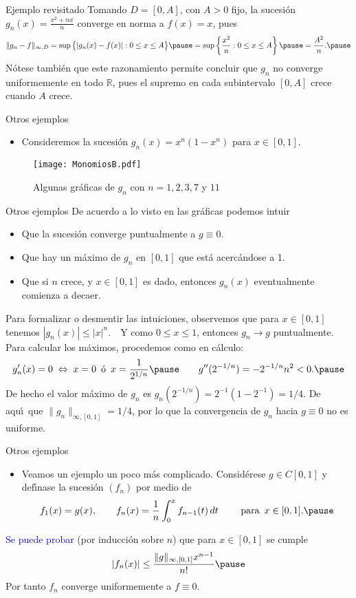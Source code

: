 \documentclass[xcolor=dvipsnames,10pt,handout, draft]{beamer}
\newcommand{\rz}{\mathbb R}
\begin{document}
\begin{frame}{Ejemplo revisitado}
Tomando $D=[0,A]$, con $A>0$ fijo, la sucesi\'on $\displaystyle g_n(x)=\frac{x^2+nx}{n}$ converge en norma a $f(x)=x$, pues
$$\|g_n-f\|_{\infty,D}=\sup\big\{|g_n(x)-f(x)|:0\leq x\leq A\big\}\pause=\sup\left\{\frac{x^2}{n}:0\leq x\leq A\right\}\pause=\frac{A^2}{n}.\pause$$
N\'otese tambi\'en que este razonamiento permite concluir que $g_n$ no converge uniformemente en todo $\rz$, pues el supremo en cada subintervalo $[0,A]$ crece cuando $A$ crece.
\end{frame}


\begin{frame}{Otros ejemplos}
\begin{itemize}
\item Consideremos la sucesi\'on $g_n(x)=x^n(1-x^n)$ para $x\in[0,1]$.\pause
\end{itemize}
\begin{figure}
\texttt{[image: MonomiosB.pdf]}
\caption{Algunas gr\'aficas de $g_n$ con $n=1,2,3,7$ y $11$}
\end{figure}
\end{frame}

\begin{frame}{Otros ejemplos}
De acuerdo a lo visto en las gr\'aficas podemos intuir\pause
\begin{itemize}
\item Que la sucesi\'on converge puntualmente a $g\equiv0$.\pause
\item Que hay un m\'aximo de $g_n$ en $[0,1]$ que est\'a acerc\'andose a 1.\pause
\item Que si $n$ crece, y $x\in[0,1]$ es dado, entonces $g_n(x)$ eventualmente comienza a decaer.\pause
\end{itemize}
Para formalizar o desmentir las intuiciones, observemos que para $x\in[0,1]$ tenemos $|g_n(x)|\leq |x|^n.\quad$\pause Y como $0\leq x\leq1$, entonces $g_n \to g$ puntualmente.
\vskip4pt\pause
Para calcular los m\'aximos, procedemos como en c\'alculo:
$$g_n'(x)=0\;\Leftrightarrow\; x=0\,\text{ \'o }\,x=\frac{1}{2^{1/n}}\pause\qquad g''(2^{-1/n})=-2^{-1/n}n^2<0.\pause$$
De hecho el valor m\'aximo de $g_n$ es $g_n(2^{-1/n})=2^{-1}(1-2^{-1})=1/4$.
\vskip4pt\pause
De aqu\'\i\ que $\|g_n\|_{\infty,[0,1]}=1/4$, por lo que la convergencia de $g_n$ hacia $g\equiv0$ no es uniforme.
\end{frame}

\begin{frame}{Otros ejemplos}
\begin{itemize}
\item Veamos un ejemplo un poco m\'as complicado. Consid\'erese $g\in C[0,1]$ y def\'\i nase la sucesi\'on $(f_n)$ por medio de 
$$f_1(x)=g(x),\qquad f_n(x)=\frac{1}{n}\int_0^xf_{n-1}(t)\,dt\qquad\text{ para }\,x\in[0,1].\pause$$
\end{itemize}
\textcolor{blue}{Se puede probar} (por inducci\'on sobre $n$) que para $x\in[0,1]$ se cumple
$$|f_n(x)|\leq\frac{\|g\|_{\infty,[0,1]}x^{n-1}}{n!}\pause$$
Por tanto $f_n$ converge uniformemente a $f\equiv0$.
\end{frame}
\end{document}
